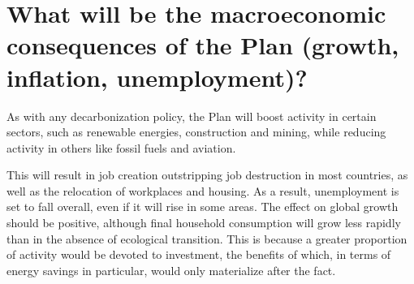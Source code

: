 \documentclass[a5paper,english,openany]{memoir}
\begin{document}
\section*{\normalsize What will be the macroeconomic consequences of the Plan (growth, inflation, unemployment)?}\label{q:macro}

As with any decarbonization %
policy, the Plan will boost activity in certain sectors, such as renewable energies, construction and mining, %
 while reducing activity in others like fossil fuels and aviation. %

This will result in job creation outstripping job destruction in most countries, as well as the relocation of workplaces and housing. As a result, unemployment is set to fall overall, even if it will rise in some areas. The effect on global growth should be positive, although final household consumption will grow less rapidly than in the absence of ecological transition. %
This is because a greater proportion of activity would be devoted to investment, the benefits of which, in terms of energy savings in particular, %
would only materialize after the fact. 
\end{document}
